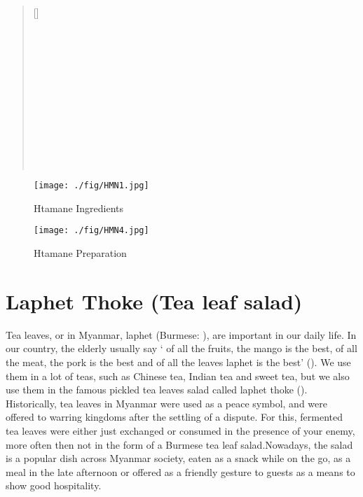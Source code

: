 \documentclass[conference]{IEEEtran}
\begin{document}
\begin{verse}[\versewidth]
\\
\\
\\
\\ 
\\
\\
\\
\\
\\
\\
\\
\\
\end{verse}

\begin{figure}[ht!]
  \centering
  \begin{minipage}[b]{0.24\textwidth}
    \texttt{[image: ./fig/HMN1.jpg]}
    \caption{Htamane Ingredients}
  \end{minipage}
  \begin{minipage}[b]{0.24\textwidth}
    \texttt{[image: ./fig/HMN4.jpg]}
    \caption{Htamane Preparation}
  \end{minipage}
\end{figure}


\section{Laphet Thoke (Tea leaf salad)}
\label{sec:TaphetThoke}
Tea leaves, or in Myanmar, laphet (Burmese: ), are important in our daily life. In our country, the elderly usually say ‘ of all the fruits, the mango is the best, of all the meat, the pork is the best and of all the leaves laphet is the best’ (). We use them in a lot of teas, such as Chinese tea, Indian tea and sweet tea, but we also use them in the famous pickled tea leaves salad called laphet thoke (). Historically, tea leaves in Myanmar were used as a peace symbol, and were offered to warring kingdoms after the settling of a dispute. For this, fermented tea leaves were either just exchanged or consumed in the presence of your enemy, more often then not in the form of a Burmese tea leaf salad.Nowadays, the salad is a popular dish across Myanmar society, eaten as a snack while on the go, as a meal in the late afternoon or offered as a friendly gesture to guests as a means to show good hospitality.
\end{document}
